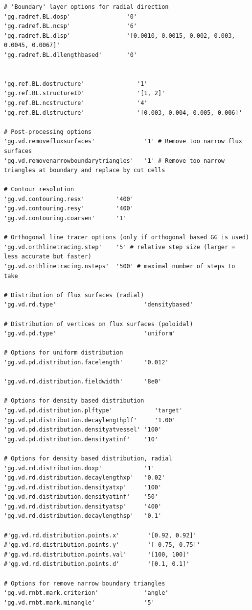 \documentclass[11pt,a4paper]{article}
\begin{document}
\begin{lstlisting}
# 'Boundary' layer options for radial direction
'gg.radref.BL.dosp'                '0'
'gg.radref.BL.ncsp'                '6'
'gg.radref.BL.dlsp'                '[0.0010, 0.0015, 0.002, 0.003, 0.0045, 0.0067]'
'gg.radref.BL.dllengthbased'       '0'


'gg.ref.BL.dostructure'               '1'
'gg.ref.BL.structureID'               '[1, 2]'
'gg.ref.BL.ncstructure'               '4'
'gg.ref.BL.dlstructure'               '[0.003, 0.004, 0.005, 0.006]'

# Post-processing options
'gg.vd.removefluxsurfaces'              '1' # Remove too narrow flux surfaces
'gg.vd.removenarrowboundarytriangles'   '1' # Remove too narrow triangles at boundary and replace by cut cells

# Contour resolution 
'gg.vd.contouring.resx'         '400'
'gg.vd.contouring.resy'         '400'
'gg.vd.contouring.coarsen'      '1'

# Orthogonal line tracer options (only if orthogonal based GG is used)
'gg.vd.orthlinetracing.step'    '5' # relative step size (larger = less accurate but faster)
'gg.vd.orthlinetracing.nsteps'  '500' # maximal number of steps to take 

# Distribution of flux surfaces (radial)
'gg.vd.rd.type'                         'densitybased'

# Distribution of vertices on flux surfaces (poloidal)
'gg.vd.pd.type'                         'uniform'

# Options for uniform distribution
'gg.vd.pd.distribution.facelength'      '0.012'

'gg.vd.rd.distribution.fieldwidth'      '8e0'

# Options for density based distribution
'gg.vd.pd.distribution.plftype'            'target'
'gg.vd.pd.distribution.decaylengthplf'     '1.00'
'gg.vd.pd.distribution.densityatvessel' '100'
'gg.vd.pd.distribution.densityatinf'    '10'

# Options for density based distribution, radial
'gg.vd.rd.distribution.doxp'            '1'
'gg.vd.rd.distribution.decaylengthxp'   '0.02'
'gg.vd.rd.distribution.densityatxp'     '100'
'gg.vd.rd.distribution.densityatinf'    '50'
'gg.vd.rd.distribution.densityatsp'     '400'
'gg.vd.rd.distribution.decaylengthsp'   '0.1'

#'gg.vd.rd.distribution.points.x'        '[0.92, 0.92]'
#'gg.vd.rd.distribution.points.y'        '[-0.75, 0.75]'
#'gg.vd.rd.distribution.points.val'      '[100, 100]'
#'gg.vd.rd.distribution.points.d'        '[0.1, 0.1]'

# Options for remove narrow boundary triangles
'gg.vd.rnbt.mark.criterion'             'angle'
'gg.vd.rnbt.mark.minangle'              '5'
\end{lstlisting}
\end{document}
